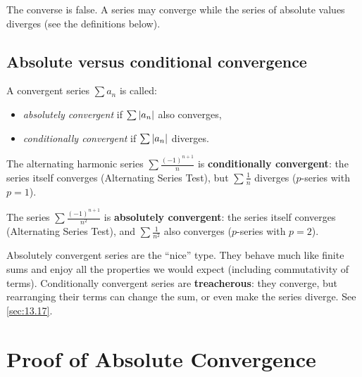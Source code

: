 \begin{remark}[Warning]
The converse is false.  A series may converge while the series of absolute values diverges (see the definitions below).
\end{remark}

\subsection*{Absolute versus conditional convergence}

\begin{definition}
\label{def:13-5}
A convergent series $\sum a_{n}$ is called:
\begin{itemize}
  \item \emph{absolutely convergent} if $\sum\left\lvert a_{n} \right\rvert$ also converges,
  \item \emph{conditionally convergent} if $\sum\left\lvert a_{n} \right\rvert$ diverges.
\end{itemize}
\end{definition}

\begin{example}
\label{ex:13-14}
The alternating harmonic series $\sum\frac{(-1)^{n+1}}{n}$ is \textbf{conditionally convergent}: the series itself converges (Alternating Series Test), but $\sum\frac{1}{n}$ diverges ($p$-series with $p=1$).
\end{example}

\begin{example}
\label{ex:13-15}
The series $\sum\frac{(-1)^{n+1}}{n^{2}}$ is \textbf{absolutely convergent}: the series itself converges (Alternating Series Test), and $\sum\frac{1}{n^{2}}$ also converges ($p$-series with $p=2$).
\end{example}

\begin{remark}
Absolutely convergent series are the ``nice'' type.  They behave much like finite sums and enjoy all the properties we would expect (including commutativity of terms).  Conditionally convergent series are \textbf{treacherous}: they converge, but rearranging their terms can change the sum, or even make the series diverge.  See \cref{sec:13.17}.
\end{remark}

\section{Proof of Absolute Convergence}
\label{sec:13.16}

